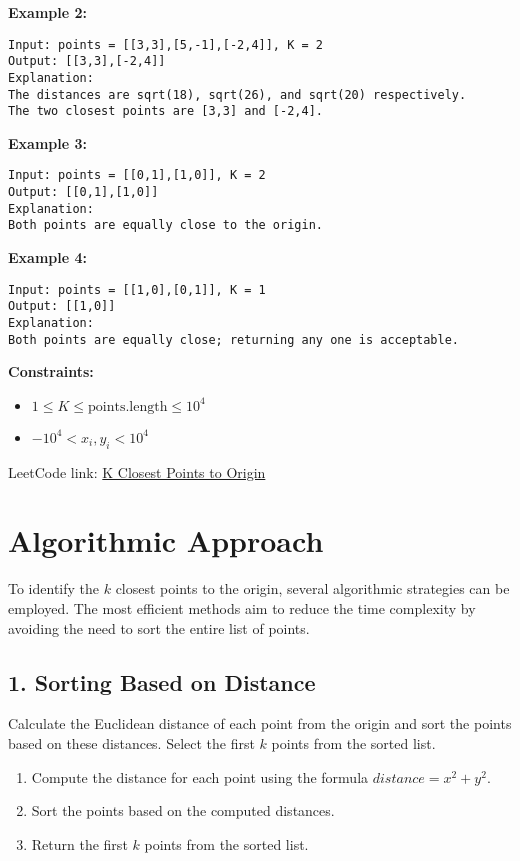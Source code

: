 \textbf{Example 2:}

\begin{verbatim}
Input: points = [[3,3],[5,-1],[-2,4]], K = 2
Output: [[3,3],[-2,4]]
Explanation: 
The distances are sqrt(18), sqrt(26), and sqrt(20) respectively.
The two closest points are [3,3] and [-2,4].
\end{verbatim}

\textbf{Example 3:}

\begin{verbatim}
Input: points = [[0,1],[1,0]], K = 2
Output: [[0,1],[1,0]]
Explanation: 
Both points are equally close to the origin.
\end{verbatim}

\textbf{Example 4:}

\begin{verbatim}
Input: points = [[1,0],[0,1]], K = 1
Output: [[1,0]]
Explanation: 
Both points are equally close; returning any one is acceptable.
\end{verbatim}

\textbf{Constraints:}

\begin{itemize}
    \item \(1 \leq K \leq \text{points.length} \leq 10^4\)
    \item \(-10^4 < x_i, y_i < 10^4\)
\end{itemize}

LeetCode link: \href{https://leetcode.com/problems/k-closest-points-to-origin/}{K Closest Points to Origin}

\section*{Algorithmic Approach}

To identify the \(k\) closest points to the origin, several algorithmic strategies can be employed. The most efficient methods aim to reduce the time complexity by avoiding the need to sort the entire list of points.

\subsection*{1. Sorting Based on Distance}

Calculate the Euclidean distance of each point from the origin and sort the points based on these distances. Select the first \(k\) points from the sorted list.

\begin{enumerate}
    \item Compute the distance for each point using the formula \(distance = x^2 + y^2\).
    \item Sort the points based on the computed distances.
    \item Return the first \(k\) points from the sorted list.
\end{enumerate}

